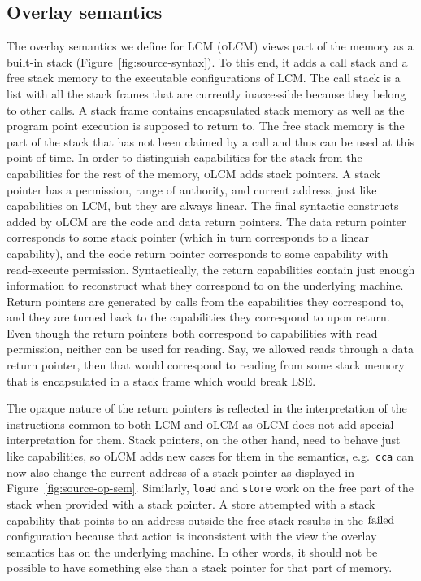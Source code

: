 \documentclass[acmsmall,review,anonymous]{acmart}\settopmatter{printfolios=true,printccs=false,printacmref=false}
\newcommand{\trgcm}{\textsc{LCM}}
\newcommand{\srccm}{\textsc{oLCM}}
\begin{document}
\subsection{Overlay semantics}
The overlay semantics we define for \trgcm{} (\srccm{}) views part of the memory as a built-in stack (Figure~\ref{fig:source-syntax}).
To this end, it adds a call stack and a free stack memory to the executable configurations of \trgcm{}.
The call stack is a list with all the stack frames that are currently inaccessible because they belong to other calls.
A stack frame contains encapsulated stack memory as well as the program point execution is supposed to return to.
The free stack memory is the part of the stack that has not been claimed by a call and thus can be used at this point of time.
In order to distinguish capabilities for the stack from the capabilities for the rest of the memory, \srccm{} adds stack pointers.
A stack pointer has a permission, range of authority, and current address, just like capabilities on \trgcm{}, but they are always linear.
The final syntactic constructs added by \srccm{} are the code and data return pointers.
The data return pointer corresponds to some stack pointer (which in turn corresponds to a linear capability), and the code return pointer corresponds to some capability with read-execute permission.
Syntactically, the return capabilities contain just enough information to reconstruct what they correspond to on the underlying machine.
Return pointers are generated by calls from the capabilities they correspond to, and they are turned back to the capabilities they correspond to upon return.
Even though the return pointers both correspond to capabilities with read permission, neither can be used for reading. 
Say, we allowed reads through a data return pointer, then that would correspond to reading from some stack memory that is encapsulated in a stack frame which would break LSE.

The opaque nature of the return pointers is reflected in the interpretation of the instructions common to both \trgcm{} and \srccm{} as \srccm{} does not add special interpretation for them.
Stack pointers, on the other hand, need to behave just like capabilities, so \srccm{} adds new cases for them in the semantics, e.g.\ \texttt{cca} can now also change the current address of a stack pointer as displayed in Figure~\ref{fig:source-op-sem}.
Similarly, \texttt{load} and \texttt{store} work on the free part of the stack when provided with a stack pointer.
A store attempted with a stack capability that points to an address outside the free stack results in the $\mathrm{failed}$ configuration because that action is inconsistent with the view the overlay semantics has on the underlying machine.
In other words, it should not be possible to have something else than a stack pointer for that part of memory.
\end{document}
